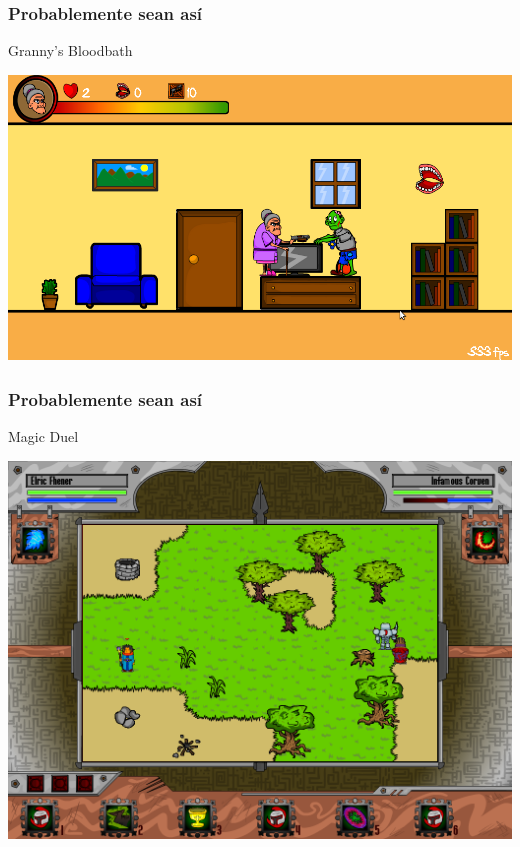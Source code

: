 \documentclass{beamer}
\begin{document}
\begin{frame}
	\frametitle{Probablemente sean así}

	\begin{center}
	Granny's Bloodbath
	
	    \includegraphics[scale=0.3]{img/grannysbloodbath.png}
	\end{center}
\end{frame}

\begin{frame}
	\frametitle{Probablemente sean así}

	\begin{center}
	Magic Duel
	
	    \includegraphics[scale=0.22]{img/magicduel.png}
	\end{center}
\end{frame}
\end{document}
